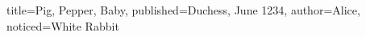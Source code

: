 \documentclass{pbml}
\begin{document}

\begin{booknotice}{title={Pig, Pepper, Baby}, published={Duchess, June 1234},
                   author=Alice, noticed=White Rabbit}





\end{booknotice}
\end{document}
